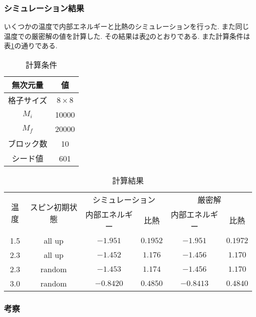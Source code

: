 \subsubsection{シミュレーション結果}
いくつかの温度で内部エネルギーと比熱のシミュレーションを行った.
また同じ温度での厳密解の値を計算した.
その結果は表\ref{tab:5a3}のとおりである.
また計算条件は表\ref{tab:5a2}の通りである.
\begin{table}[h]
\caption{計算条件}
\label{tab:5a2}
\centering
\begin{tabular}{cc}
\hline
無次元量&値\\
\hline \hline
格子サイズ&$8\times 8$\\
$M_i$&10000\\
$M_f$&20000\\
ブロック数&10\\
シード値&601\\
\hline
\end{tabular}
\end{table}
\begin{table}[h]
\caption{計算結果}
\label{tab:5a3}
\centering
\begin{tabular}{cc|cc|cc}
\hline
\multirow{2}{*}{温度}&\multirow{2}{*}{スピン初期状態}&\multicolumn{2}{c|}{シミュレーション}&\multicolumn{2}{c}{厳密解}\\
&&内部エネルギー&比熱&内部エネルギー&比熱\\
\hline \hline
1.5&all up&$-1.951$&$0.1952$&$-1.951$&$0.1972$\\
2.3&all up&$-1.452$&$1.176$&$-1.456$&$1.170$\\
2.3&random&$-1.453$&$1.174$&$-1.456$&$1.170$\\
3.0&random&$-0.8420$&$0.4850$&$-0.8413$&$0.4840$\\
\hline
\end{tabular}
\end{table}
\subsubsection{考察}